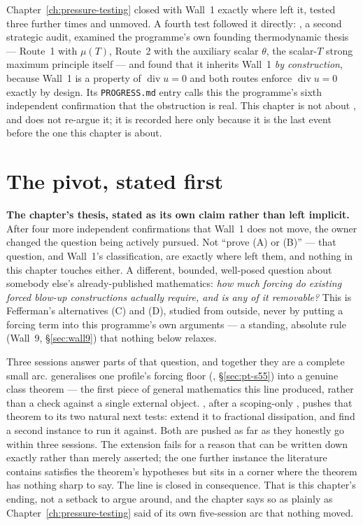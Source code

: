 Chapter~\ref{ch:pressure-testing} closed with Wall~1 exactly where 
left it, tested three further times and unmoved. A fourth test followed it
directly: , a second strategic audit, examined the programme's own
founding thermodynamic thesis --- Route~1 with \(\mu(T)\), Route~2 with the
auxiliary scalar \(\theta\), the scalar-\(T\) strong maximum principle itself
--- and found that it inherits Wall~1 \emph{by construction}, because Wall~1
is a property of \(\operatorname{div}u=0\) and both routes enforce
\(\operatorname{div}u=0\) exactly by design. Its \texttt{PROGRESS.md} entry
calls this the programme's sixth independent confirmation that the obstruction
is real. This chapter is not about , and does not re-argue it; it is
recorded here only because it is the last event before the one this chapter
is about.

\section{The pivot, stated first}
\label{sec:ff-thesis}

\begin{record}
\textbf{The chapter's thesis, stated as its own claim rather than left
implicit.} After four more independent confirmations that Wall~1 does not
move, the owner changed the question being actively pursued. Not ``prove (A)
or (B)'' --- that question, and Wall~1's classification, are exactly where
 left them, and nothing in this chapter touches either. A different,
bounded, well-posed question about somebody else's already-published
mathematics: \emph{how much forcing do existing forced blow-up constructions
actually require, and is any of it removable?} This is Fefferman's
alternatives (C) and (D), studied from outside, never by putting a forcing
term into this programme's own arguments --- a standing, absolute rule
(Wall~9, \S\ref{sec:wall9}) that nothing below relaxes.

\smallskip
Three sessions answer parts of that question, and together they are a
complete small arc.  generalises one profile's forcing floor
(, \S\ref{sec:pt-s55}) into a genuine class theorem --- the first
piece of general mathematics this line produced, rather than a check against
a single external object. , after a scoping-only , pushes that
theorem to its two natural next tests: extend it to fractional dissipation,
and find a second instance to run it against. Both are pushed as far as they
honestly go within three sessions. The extension fails for a reason that can
be written down exactly rather than merely asserted; the one further
instance the literature contains satisfies the theorem's hypotheses but sits
in a corner where the theorem has nothing sharp to say. The line is closed in
consequence. That is this chapter's ending, not a setback to argue around,
and the chapter says so as plainly as Chapter~\ref{ch:pressure-testing} said
of its own five-session arc that nothing moved.
\end{record}

